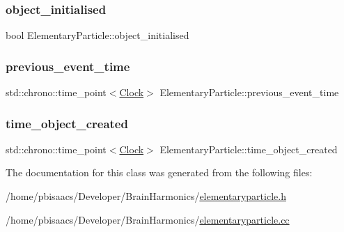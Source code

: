 \subsubsection{\texorpdfstring{object\+\_\+initialised}{object\_initialised}}
{\footnotesize\ttfamily bool Elementary\+Particle\+::object\+\_\+initialised\hspace{0.3cm}{\ttfamily [private]}}

\mbox{\label{classElementaryParticle_a8b0b30058853d850c0853fc101f5d45c}} 
\subsubsection{\texorpdfstring{previous\+\_\+event\+\_\+time}{previous\_event\_time}}
{\footnotesize\ttfamily std\+::chrono\+::time\+\_\+point$<$\mbox{\hyperlink{universe_8h_a0ef8d951d1ca5ab3cfaf7ab4c7a6fd80}{Clock}}$>$ Elementary\+Particle\+::previous\+\_\+event\+\_\+time\hspace{0.3cm}{\ttfamily [private]}}

\mbox{\label{classElementaryParticle_af7a592e44e4ccc8f1b19cd4c49ab50c3}} 
\subsubsection{\texorpdfstring{time\+\_\+object\+\_\+created}{time\_object\_created}}
{\footnotesize\ttfamily std\+::chrono\+::time\+\_\+point$<$\mbox{\hyperlink{universe_8h_a0ef8d951d1ca5ab3cfaf7ab4c7a6fd80}{Clock}}$>$ Elementary\+Particle\+::time\+\_\+object\+\_\+created\hspace{0.3cm}{\ttfamily [private]}}



The documentation for this class was generated from the following files\+:\begin{DoxyCompactItemize}
\item 
/home/pbisaacs/\+Developer/\+Brain\+Harmonics/\mbox{\hyperlink{elementaryparticle_8h}{elementaryparticle.\+h}}\item 
/home/pbisaacs/\+Developer/\+Brain\+Harmonics/\mbox{\hyperlink{elementaryparticle_8cc}{elementaryparticle.\+cc}}\end{DoxyCompactItemize}
